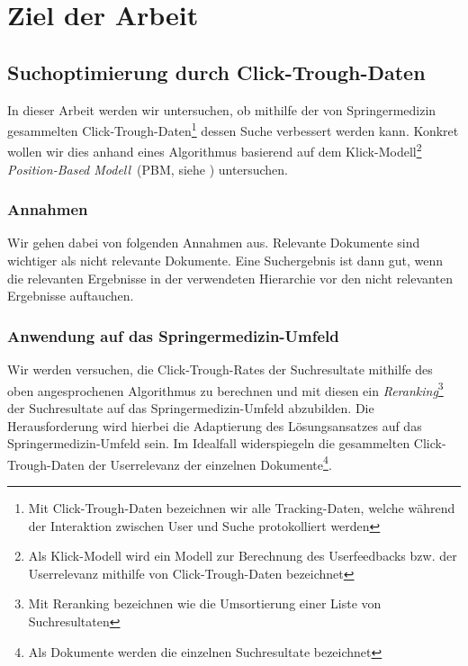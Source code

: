 \pagebreak
\section{Ziel der Arbeit}
\label{sec:Einfuehrung:ZielArbeit}

\subsection{Suchoptimierung durch Click-Trough-Daten}
\label{sec:Einfuehrung:ZielArbeit:Suchoptimierung}

In dieser Arbeit werden wir untersuchen, ob mithilfe der von Springermedizin gesammelten Click-Trough-Daten\footnote{Mit Click-Trough-Daten bezeichnen wir alle Tracking-Daten, welche während der Interaktion zwischen User und Suche protokolliert werden} dessen Suche verbessert werden kann. Konkret wollen wir dies anhand eines Algorithmus basierend auf dem Klick-Modell\footnote{Als Klick-Modell wird ein Modell zur Berechnung des Userfeedbacks bzw. der Userrelevanz mithilfe von Click-Trough-Daten bezeichnet} \textit{Position-Based Modell}~(PBM, siehe \cite{pbm}) untersuchen.

\subsubsection{Annahmen}
\label{sec:Einfuehrung:ZielArbeit:Suchoptimierung:Annahmen}

Wir gehen dabei von folgenden Annahmen aus. Relevante Dokumente sind wichtiger als nicht relevante Dokumente. Eine Suchergebnis ist dann gut, wenn die relevanten Ergebnisse in der verwendeten Hierarchie vor den nicht relevanten Ergebnisse auftauchen. 

\subsubsection{Anwendung auf das Springermedizin-Umfeld}
\label{sec:Einfuehrung:ZielArbeit:Suchoptimierung:AnwendungSpringermedizin-Umfeld}

Wir werden versuchen, die Click-Trough-Rates der Suchresultate mithilfe des oben angesprochenen Algorithmus zu berechnen und mit diesen ein \textit{Reranking}\footnote{Mit Reranking bezeichnen wie die Umsortierung einer Liste von Suchresultaten} der Suchresultate auf das Springermedizin-Umfeld abzubilden. Die Herausforderung wird hierbei die Adaptierung des Lösungsansatzes auf das Springermedizin-Umfeld sein. Im Idealfall widerspiegeln die gesammelten Click-Trough-Daten der Userrelevanz der einzelnen Dokumente\footnote{Als Dokumente werden die einzelnen Suchresultate bezeichnet}.

